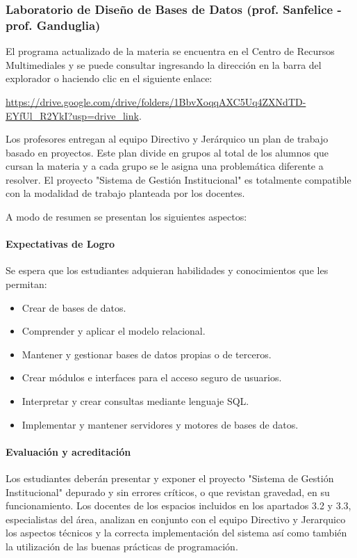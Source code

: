 
\subsubsection{Laboratorio de Diseño de Bases de Datos (prof. Sanfelice - prof. Ganduglia)} 

El programa actualizado de la materia se encuentra en el Centro de Recursos Multimediales y se puede consultar ingresando la dirección en la barra del explorador o haciendo clic en el siguiente enlace:

\url{https://drive.google.com/drive/folders/1BbvXoqqAXC5Uq4ZXNdTD-EYfUl_R2YkI?usp=drive_link}.

Los profesores entregan al equipo Directivo y Jerárquico un plan de trabajo basado en proyectos. Este plan divide en grupos al total de los alumnos que cursan la materia y a cada grupo se le asigna una problemática diferente a resolver. El proyecto "Sistema de Gestión Institucional" es totalmente compatible con la modalidad de trabajo planteada por los docentes.

A modo de resumen se presentan los siguientes aspectos:
\paragraph{Expectativas de Logro}
Se espera que los estudiantes adquieran habilidades y conocimientos que les permitan: 

\begin{itemize}
    \item Crear de bases de datos.
    \item Comprender y aplicar el modelo relacional.
    \item Mantener y gestionar bases de datos propias o de terceros.
    \item Crear módulos e interfaces para el acceso seguro de usuarios.
    \item Interpretar y crear consultas mediante lenguaje SQL.
    \item Implementar y mantener servidores y motores de bases de datos. 
\end{itemize}

\paragraph{Evaluación y acreditación}

Los estudiantes deberán presentar y exponer el proyecto "Sistema de Gestión Institucional" depurado y sin errores críticos, o que revistan gravedad, en su funcionamiento. Los docentes de los espacios incluidos en los apartados 3.2 y 3.3, especialistas del área, analizan en conjunto con el equipo Directivo y Jerarquico los aspectos técnicos y la correcta implementación del sistema así como también la utilización de las buenas prácticas de programación.

